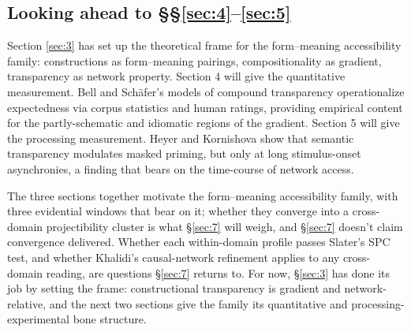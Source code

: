 \subsection{Looking ahead to §§\ref{sec:4}--\ref{sec:5}}

Section \ref{sec:3} has set up the theoretical frame for the form--meaning accessibility family: constructions as form--meaning pairings, compositionality as gradient, transparency as network property. Section 4 will give the quantitative measurement. Bell and Schäfer's \autocite*{bell-schafer-2016-modelling-transparency} models of compound transparency operationalize expectedness via corpus statistics and human ratings, providing empirical content for the partly-schematic and idiomatic regions of the gradient. Section 5 will give the processing measurement. Heyer and Kornishova \autocite*{heyer-kornishova-2018-priming-eventually} show that semantic transparency modulates masked priming, but only at long stimulus-onset asynchronies, a finding that bears on the time-course of network access.

The three sections together motivate the form--meaning accessibility family, with three evidential windows that bear on it; whether they converge into a cross-domain projectibility cluster is what §\ref{sec:7} will weigh, and §\ref{sec:7} doesn't claim convergence delivered. Whether each within-domain profile passes Slater's \autocite*{slater-2015-natural-kindness} SPC test, and whether Khalidi's \autocite*{khalidi-2018-causal-networks} causal-network refinement applies to any cross-domain reading, are questions §\ref{sec:7} returns to. For now, §\ref{sec:3} has done its job by setting the frame: constructional transparency is gradient and network-relative, and the next two sections give the family its quantitative and processing-experimental bone structure.
